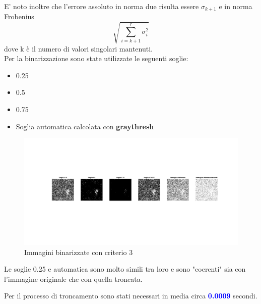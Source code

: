 \noindent
E' noto inoltre che l'errore assoluto in norma due risulta essere $\sigma_{k+1}$ e in norma Frobenius 
\begin{equation}
    \sqrt{\sum_{i=k+1}^{r}\sigma_i^2}
\end{equation}
 dove k è il numero di valori singolari mantenuti.\\
Per la binarizzazione sono state utilizzate le seguenti soglie:
\begin{itemize}
    \item 0.25
    \item 0.5
    \item 0.75
    \item Soglia automatica calcolata con \textbf{graythresh}
\end{itemize}

\begin{figure}[H]
    \centering
     \includegraphics[width=\textwidth]{images/Criterio3.jpg}
    \caption{Immagini binarizzate con criterio 3}
\end{figure}

\noindent Le soglie 0.25 e automatica sono molto simili tra loro e sono "coerenti" sia con l'immagine originale che con quella troncata.

\noindent Per il processo di troncamento sono stati necessari in media circa \textcolor{blue}{\textbf{0.0009}} secondi.\\



